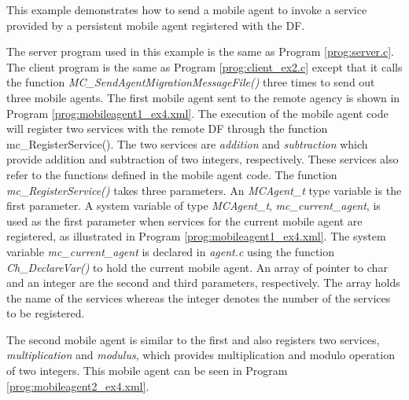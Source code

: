 \documentclass[11pt]{report}
\begin{document}
This example demonstrates how to send a mobile agent to invoke a service 
provided by a persistent mobile agent registered with the DF.

The server program used in this example is the same as Program 
\vref{prog:server.c}. 
The client program is the same as Program \vref{prog:client_ex2.c} except 
that it calls the function \textit{MC\_SendAgentMigrationMessageFile()} three
times to send out three mobile agents.
The first mobile agent sent to the remote agency is 
shown in Program 
\vref{prog:mobileagent1_ex4.xml}.
The execution of the mobile agent code will register two services with the 
remote DF through the function mc\_RegisterService(). 
The two services are \textit{addition} and \textit{subtraction} which 
provide addition and subtraction of two integers, respectively.
These services also refer to the functions defined in the mobile agent code.
The function \textit{mc\_RegisterService()} 
takes three parameters. 
An \textit{MCAgent\_t} type variable is the first parameter. 
A system variable of type \textit{MCAgent\_t}, \textit{mc\_current\_agent}, 
is used as the first parameter when services for 
the current mobile agent are registered, as illustrated in Program 
\vref{prog:mobileagent1_ex4.xml}.
The system variable \textit{mc\_current\_agent} 
is declared in \textit{agent.c} using the function \textit{Ch\_DeclareVar()} 
to hold the current mobile agent.
An array of pointer to char and an integer are the second and third 
parameters, respectively.
The array holds the name of the services whereas the integer denotes the 
number of the services to be registered. 

The second mobile agent is similar to the first and also registers two
services, \textit{multiplication} and \textit{modulus}, which provides 
multiplication and modulo operation of two integers. 
This mobile agent can be seen in Program \vref{prog:mobileagent2_ex4.xml}.
\end{document}
